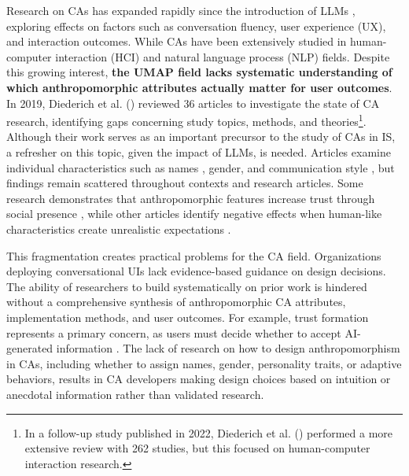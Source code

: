 \documentclass[manuscript,anonymous,sigconf]{acmart}
\begin{document}

Research on CAs has expanded rapidly since the introduction of LLMs \citep{chen2024trends}, exploring effects on factors such as conversation fluency, user experience (UX), and interaction outcomes. While CAs have been extensively studied in human-computer interaction (HCI) and natural language process (NLP) fields.
Despite this growing interest, \textbf{the UMAP field lacks systematic understanding of which anthropomorphic attributes actually matter for user outcomes}. In 2019, Diederich et al. (\citeyear{diederich_conversational_2019}) reviewed 36 articles to investigate the state of CA research, identifying gaps concerning study topics, methods, and theories\footnote{In a follow-up study published in 2022, Diederich et al. (\citeyear{diederich_design_2022}) performed a more extensive review with 262 studies, but this focused on human-computer interaction research.}. Although their work serves as an important precursor to the study of CAs in IS, a refresher on this topic, given the impact of LLMs, is needed. Articles examine individual characteristics such as names \citep{go2019humanizing}, gender, and communication style \citep{seeger2021texting}, but findings remain scattered throughout contexts and research articles. Some research demonstrates that anthropomorphic features increase trust through social presence \citep{konya2023anthropomorphism,blut2021understanding}, while other articles identify negative effects when human-like characteristics create unrealistic expectations \citep{crolic2022blame,ciechanowski2019shades}.

This fragmentation creates practical problems for the CA field. Organizations deploying conversational UIs lack evidence-based guidance on design decisions. The ability of researchers to build systematically on prior work is hindered without a comprehensive synthesis of anthropomorphic CA attributes, implementation methods, and user outcomes.
For example, trust formation represents a primary concern, as users must decide whether to accept AI-generated information \citep{meyer2023leverage,følstad2021chatbots,nordheim2019trust}. %
The lack of research on how to design anthropomorphism in CAs, including whether to assign names, gender, personality traits, or adaptive behaviors, results in CA developers making design choices based on intuition or anecdotal information rather than validated research.
\end{document}
